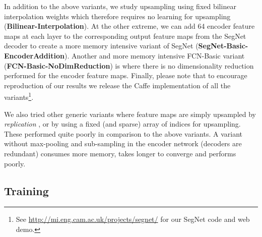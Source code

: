 In addition to the above variants, we study upsampling using fixed bilinear interpolation weights which therefore requires no learning for upsampling (\textbf{Bilinear-Interpolation}). At the other extreme, we can add 64 encoder feature maps at each layer to the corresponding output feature maps from the SegNet decoder to create a more memory intensive variant of SegNet (\textbf{SegNet-Basic-EncoderAddition}). Another and more memory intensive FCN-Basic variant (\textbf{FCN-Basic-NoDimReduction}) is where there is no dimensionality reduction performed for the encoder feature maps. Finally, please note that to encourage reproduction of our results we release the Caffe \citep{jia2014caffe} implementation of all the variants\footnote{See \url{http://mi.eng.cam.ac.uk/projects/segnet/} for our SegNet code and web demo.}. 

We also tried other generic variants where feature maps are simply upsampled by \textit{replication} \citep{FarabetPAMI}, or by using a fixed (and sparse) array of indices for upsampling. These performed quite poorly in comparison to the above variants. A variant without max-pooling and sub-sampling in the encoder network (decoders are redundant) consumes more memory, takes longer to converge and performs poorly. 

\subsection{Training}
\label{Training}


